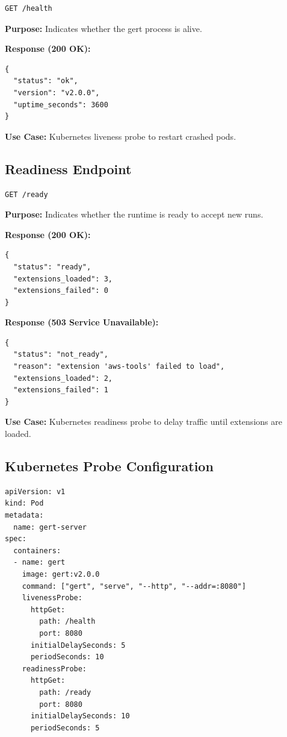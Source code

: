 \begin{verbatim}
GET /health
\end{verbatim}

\textbf{Purpose:} Indicates whether the gert process is alive.

\textbf{Response (200 OK):}
\begin{verbatim}
{
  "status": "ok",
  "version": "v2.0.0",
  "uptime_seconds": 3600
}
\end{verbatim}

\textbf{Use Case:} Kubernetes liveness probe to restart crashed pods.

\subsection{Readiness Endpoint}

\begin{verbatim}
GET /ready
\end{verbatim}

\textbf{Purpose:} Indicates whether the runtime is ready to accept new runs.

\textbf{Response (200 OK):}
\begin{verbatim}
{
  "status": "ready",
  "extensions_loaded": 3,
  "extensions_failed": 0
}
\end{verbatim}

\textbf{Response (503 Service Unavailable):}
\begin{verbatim}
{
  "status": "not_ready",
  "reason": "extension 'aws-tools' failed to load",
  "extensions_loaded": 2,
  "extensions_failed": 1
}
\end{verbatim}

\textbf{Use Case:} Kubernetes readiness probe to delay traffic until extensions are loaded.

\subsection{Kubernetes Probe Configuration}

\begin{verbatim}
apiVersion: v1
kind: Pod
metadata:
  name: gert-server
spec:
  containers:
  - name: gert
    image: gert:v2.0.0
    command: ["gert", "serve", "--http", "--addr=:8080"]
    livenessProbe:
      httpGet:
        path: /health
        port: 8080
      initialDelaySeconds: 5
      periodSeconds: 10
    readinessProbe:
      httpGet:
        path: /ready
        port: 8080
      initialDelaySeconds: 10
      periodSeconds: 5
\end{verbatim}

